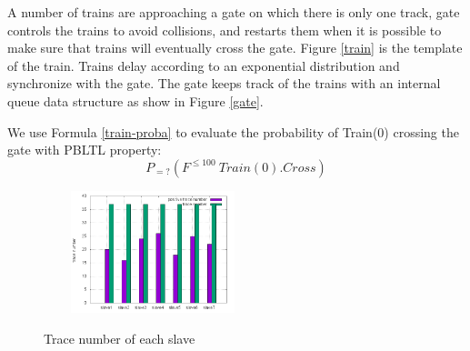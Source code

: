 A number of trains are approaching a gate on which there is only one track, gate controls the trains to avoid collisions, and restarts them when it is possible to make sure that trains will eventually cross the gate. Figure \ref{train} is the template of the train. Trains delay according to an exponential distribution and synchronize with the gate. The gate keeps track of the trains with an internal queue data structure as show in Figure \ref{gate}.
\begin{figure}[htbp]
\end{figure}
We use Formula \ref{train-proba} to evaluate the probability of Train(0) crossing the gate with PBLTL property:
\begin{equation}
P_{=?}(F^{\leq100}~Train(0).Cross)
\label{train-proba}
\end{equation}
\begin{figure}[htbp]
	\centering
	{\includegraphics[width=2.5in,height=1.4in]{fig/trace-slave.png}}
	\caption{Trace number of each slave}
   \label{trace-slave}
\end{figure}
